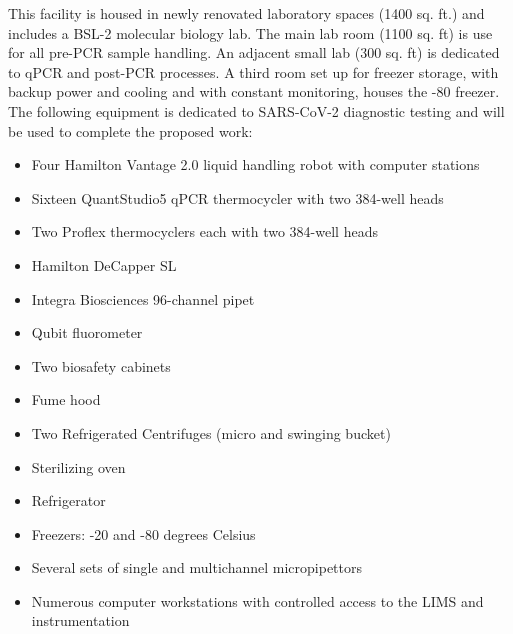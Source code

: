 \documentclass[
]{book}
\providecommand{\tightlist}{%
  \setlength{\itemsep}{0pt}\setlength{\parskip}{0pt}}
\begin{document}
This facility is housed in newly renovated laboratory spaces (1400 sq. ft.) and includes a BSL-2 molecular biology lab. The main lab room (1100 sq. ft) is use for all pre-PCR sample handling. An adjacent small lab (300 sq. ft) is dedicated to qPCR and post-PCR processes. A third room set up for freezer storage, with backup power and cooling and with constant monitoring, houses the -80 freezer. The following equipment is dedicated to SARS-CoV-2 diagnostic testing and will be used to complete the proposed work:

\begin{itemize}
\tightlist
\item
  Four Hamilton Vantage 2.0 liquid handling robot with computer stations
\item
  Sixteen QuantStudio5 qPCR thermocycler with two 384-well heads
\item
  Two Proflex thermocyclers each with two 384-well heads
\item
  Hamilton DeCapper SL
\item
  Integra Biosciences 96-channel pipet
\item
  Qubit fluorometer
\item
  Two biosafety cabinets
\item
  Fume hood
\item
  Two Refrigerated Centrifuges (micro and swinging bucket)
\item
  Sterilizing oven
\item
  Refrigerator
\item
  Freezers: -20 and -80 degrees Celsius
\item
  Several sets of single and multichannel micropipettors
\item
  Numerous computer workstations with controlled access to the LIMS and instrumentation
\end{itemize}
\end{document}
